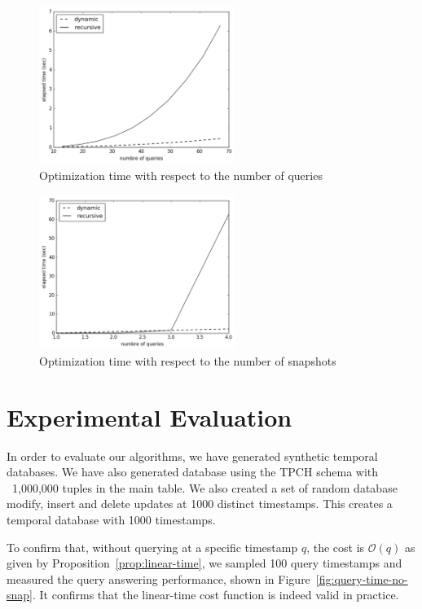 \begin{figure}[tb]
    \centering
    \includegraphics[width=2.5in]{figs/multiquery_runtime.pdf}
    \caption{Optimization time with respect to the number of queries}
    \label{fig:plan-time-n}
\end{figure}


\begin{figure}[tb]
    \centering
    \includegraphics[width=2.5in]{figs/multisnap_runtime.pdf}
    \caption{Optimization time with respect to the number of snapshots}
    \label{fig:plan-time-m}
\end{figure}




\section{Experimental Evaluation}

In order to evaluate our algorithms, we have generated synthetic temporal 
databases.  We have also generated database using the TPCH schema with
~1,000,000 tuples in the main table.  We also created a set of random database
modify, insert and delete updates at 1000 distinct timestamps.  This creates a
temporal database with 1000 timestamps.

To confirm that, without querying at a specific timestamp $q$, the cost is
$\mathcal{O}(q)$ as given by Proposition~\ref{prop:linear-time}, we sampled
100 query timestamps and measured the query answering performance, shown in
Figure~\ref{fig:query-time-no-snap}.  It confirms that the linear-time cost
function is indeed valid in practice.


